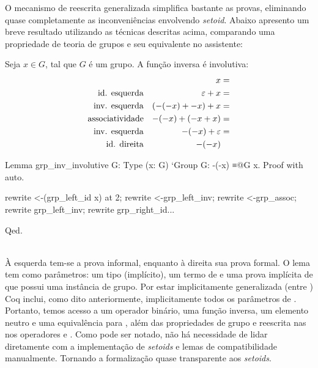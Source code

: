 O mecanismo de reescrita generalizada simplifica bastante as provas, eliminando quase completamente as inconveniências envolvendo \textit{setoid}. Abaixo apresento um breve resultado utilizando as técnicas descritas acima, comparando uma propriedade de teoria de grupos e seu equivalente no assistente:
\vspace*{.4em}\\
\begin{minipage}[t]{0.5\linewidth}
	\begin{corolario}
		Seja $x \in G$, tal que $G$ é um grupo. A função inversa é involutiva:
		\begin{align*}
			& & x& =\\
			\text{\textup{id. esquerda}}& & \varepsilon + x& =\\
			\text{\textup{inv. esquerda}}& & (-(-x) + -x) + x& =\\
			\text{\textup{associatividade}}& & -(-x) + (-x + x)& =\\
			\text{\textup{inv. esquerda}}& & -(-x) + \varepsilon& =\\
			\text{\textup{id. direita}}& & -(-x) &
		\end{align*}
	\end{corolario}
\end{minipage}
\hspace{1em}
\begin{minipage}[t]{0.5\linewidth}
	\begin{coqcode}
Lemma grp_inv_involutive {G: Type}
  (x: G) `{Group G}: -(-x) ≡@{G} x.
Proof with auto.

		
rewrite <-(grp_left_id x) at 2;
rewrite <-grp_left_inv;
rewrite <-grp_assoc;
rewrite grp_left_inv;
rewrite grp_right_id...
		
Qed.
	\end{coqcode}
\end{minipage}\vspace*{.6em}\\
À esquerda tem-se a prova informal, enquanto à direita sua prova formal. O lema  tem como parâmetros: um tipo  (implícito), um termo  de  e uma prova implícita de que  possui uma instância de grupo. Por estar implicitamente generalizada (entre ) Coq inclui, como dito anteriormente, implicitamente todos os parâmetros de . Portanto, temos acesso a um operador binário, uma função inversa, um elemento neutro e uma equivalência para , além das propriedades de grupo e reescrita nas nos operadores \coqinline{+} e \coqinline{-}. Como pode ser notado, não há necessidade de lidar diretamente com a implementação de \textit{setoids} e lemas de compatibilidade manualmente. Tornando a formalização quase transparente aos \textit{setoids}.